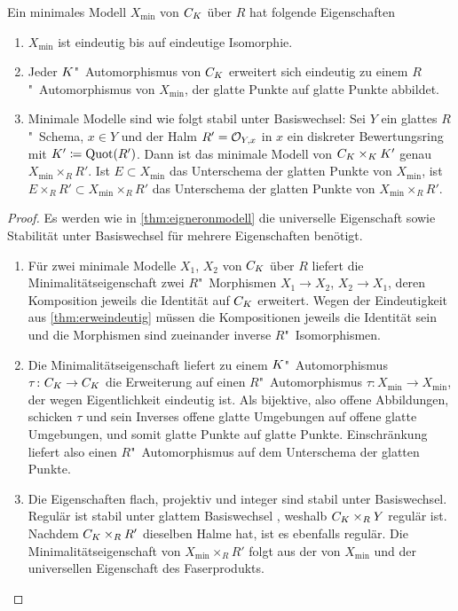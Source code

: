 \begin{Satz}\label{thm:eigminmodell}
  Ein minimales Modell $X_{\text{min}}$ von $C_{K}$ über $R$ hat
  folgende Eigenschaften
  \begin{enumerate}[label=(\alph*)]
  \item $X_{\text{min}}$ ist eindeutig bis auf eindeutige Isomorphie.
  \item{}
    Jeder $K$"~Automorphismus von $C_{K}$ erweitert sich eindeutig zu
    einem $R$"~Automorphismus von $X_{\text{min}}$, der glatte Punkte
    auf glatte Punkte abbildet.
  \item{}
    Minimale Modelle sind wie folgt stabil unter Basiswechsel:
    Sei $Y$ ein glattes $R$"~Schema, ${x\in Y}$ und der Halm
    ${R'=\mathcal{O}_{Y,x}}$ in $x$  ein diskreter Bewertungsring mit
    ${K'\coloneqq\operatorname{Quot}(R')}$.
    Dann ist das minimale Modell von $C_{K}\times_{K}K'$ genau
    $X_{\text{min}}\times_R R'$.
    Ist $E\subset X_{\text{min}}$ das Unterschema der glatten Punkte
    von $X_{\text{min}}$, ist
    $E\times_R R'\subset X_{\text{min}}\times_R R'$ das Unterschema
    der glatten Punkte von $X_{\text{min}}\times_R R'$.
  \end{enumerate}
  \begin{proof}
    Es werden wie in \ref{thm:eigneronmodell} die universelle
    Eigenschaft sowie Stabilität unter Basiswechsel für mehrere
    Eigenschaften benötigt.
    \begin{enumerate}[resume*,start=1]
    \item Für zwei minimale Modelle $X_1$, $X_2$ von $C_{K}$ über $R$
      liefert die Minimalitätseigenschaft zwei $R$"~Morphismen
      $X_1\to X_2$, $X_2\to X_1$, deren Komposition jeweils die
      Identität auf $C_{K}$ erweitert. Wegen der Eindeutigkeit aus
      \ref{thm:erweindeutig} müssen die Kompositionen jeweils die
      Identität sein und die Morphismen sind zueinander inverse
      $R$"~Isomorphismen.
    \item Die Minimalitätseigenschaft liefert zu einem
      $K$"~Automorphismus $\tau\colon C_{K}\to C_{K}$ die Erweiterung auf
      einen $R$"~Automorphismus
      $\tau\colon X_{\text{min}}\to X_{\text{min}}$, der wegen
      Eigentlichkeit eindeutig ist.
      Als bijektive, also offene Abbildungen, schicken $\tau$ und
      sein Inverses offene glatte Umgebungen auf offene glatte
      Umgebungen, und somit glatte Punkte auf glatte
      Punkte. Einschränkung liefert also einen $R$"~Automorphismus auf
      dem Unterschema der glatten Punkte.
    \item Die Eigenschaften flach, projektiv und integer sind stabil
      unter Basiswechsel. Regulär ist stabil unter glattem
      Basiswechsel \cite[Chapter~2.3, S.\,49]{neron}, weshalb
      $C_{K}\times_R Y$ regulär ist.
      Nachdem $C_{K}\times_R R'$ dieselben Halme hat, ist es ebenfalls
      regulär.
      Die Minimalitätseigenschaft von ${X_{\text{min}}\times_R R'}$
      folgt aus der von $X_{\text{min}}$ und der universellen
      Eigenschaft des Faserprodukts.
      

\end{enumerate}
\end{proof}
\end{Satz}

